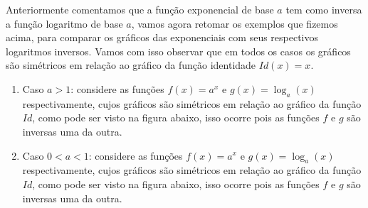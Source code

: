   Anteriormente comentamos que a função exponencial de base $a$ tem como inversa a função logaritmo de base $a$, vamos agora retomar os exemplos que fizemos acima, para comparar os gráficos das exponenciais com seus respectivos logaritmos inversos. Vamos com isso observar que em todos os casos os gráficos são simétricos em relação ao gráfico da função identidade $Id(x)= x$.

  \begin{enumerate}
   \item Caso $a>1$: considere as funções $f(x)= a^x$ e $g(x)= \log_{a}(x)$ respectivamente, cujos gráficos são simétricos em relação ao gráfico da função $Id$, como pode ser visto na figura abaixo, isso ocorre pois as funções $f$ e $g$ são inversas uma da outra.

   \begin{center}
    \end{center}
    

   \item Caso $0<a<1$: considere as funções $f(x)= a^x$ e $g(x)= \log_a(x)$ respectivamente, cujos gráficos são simétricos em relação ao gráfico da função $Id$, como pode ser visto na figura abaixo, isso ocorre pois as funções $f$ e $g$ são inversas uma da outra.


\end{enumerate}

